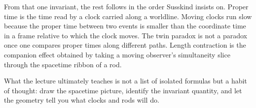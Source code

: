From that one invariant, the rest follows in the order Susskind insists on. Proper time is the time read by a clock carried along a worldline. Moving clocks run slow because the proper time between two events is smaller than the coordinate time in a frame relative to which the clock moves. The twin paradox is not a paradox once one compares proper times along different paths. Length contraction is the companion effect obtained by taking a moving observer's simultaneity slice through the spacetime ribbon of a rod.

What the lecture ultimately teaches is not a list of isolated formulas but a habit of thought: draw the spacetime picture, identify the invariant quantity, and let the geometry tell you what clocks and rods will do.